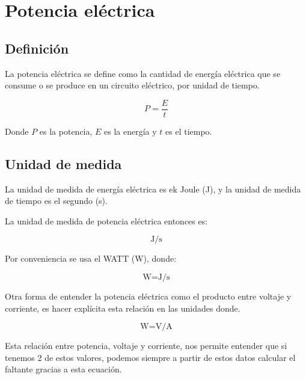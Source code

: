 \documentclass[../principal.tex]{subfiles}
\begin{document}
\chapter{Potencia eléctrica}

\section{Definición}

La potencia eléctrica se define como la cantidad de energía eléctrica que se consume o se produce en un circuito eléctrico, por unidad de tiempo.

\begin{equation}
    P = \frac{E}{t}
\end{equation}

Donde $P$ es la potencia, $E$ es la energía y $t$ es el tiempo.

\section{Unidad de medida}

La unidad de medida de energía eléctrica es ek Joule (\unit{\joule}), y la unidad de medida de tiempo es el segundo (\unit{\second}).

La unidad de medida de potencia eléctrica entonces es:

\begin{equation}
    \unit{\joule\per\second}
\end{equation}

Por conveniencia se usa el WATT (\unit{\watt}), donde:

\begin{equation}
    \unit{\watt} = \unit{\joule\per\second}
\end{equation}

Otra forma de entender la potencia eléctrica como el producto entre voltaje y corriente, es hacer explícita esta relación en las unidades donde.

\begin{equation}
    \unit{\watt} = \unit{\volt\per\ampere}
\end{equation}

Esta relación entre potencia, voltaje y corriente, nos permite entender que si tenemos 2 de estos valores, podemos siempre a partir de estos datos calcular el faltante gracias a esta ecuación.
\end{document}
